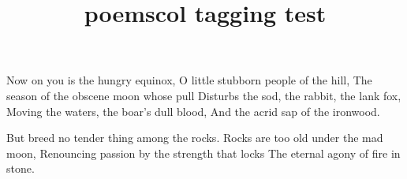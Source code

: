 \documentclass[twoside]{book}
\title{poemscol tagging test}
\begin{document}
\begin{poem}
\begin{stanza}
Now on you is the hungry equinox,\verseline
O little stubborn people of the hill,\verseline
The season of the obscene moon whose pull\verseline
Disturbs the sod, the rabbit, the lank fox,\verseline
Moving the waters, the boar's dull blood,\verseline
And the acrid sap of the ironwood.
\end{stanza}

\begin{stanza}
But breed no tender thing among the rocks.\verseline
Rocks are too old under the mad moon,\verseline
Renouncing passion by the strength that locks\verseline
The eternal agony of fire in stone.
\end{stanza}
\end{poem}
\end{document}
